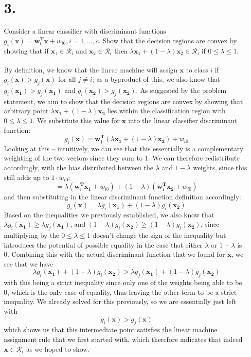 \documentclass{article}
\begin{document}
{\Large 

\section*{3.}
Consider a linear classifier with discriminant functions \(g_i(\mathbf{x}) = \mathbf{w}_\mathbf{i}^{\mathbf{T}} \mathbf{x} + w_{i0}, i = 1, \dots, c\). Show that the decision regions are convex by showing that if \(\mathbf{x}_1 \in \mathcal{R}_i\) and \(\mathbf{x}_2 \in \mathcal{R}_i\) then \(\lambda \mathbf{x}_1 + (1 - \lambda) \mathbf{x}_2 \in \mathcal{R}_i\) if \(0 \leq \lambda \leq 1\). \\ \\
By definition, we know that the linear machine will assign \(\mathbf{x}\) to class \(i\) if \(g_i(\mathbf{x}) > g_j(\mathbf{x})\) for all \(j \neq i\); as a byproduct of this, we also know that \(g_i(\mathbf{x_1}) > g_j(\mathbf{x_1})\) and \(g_i(\mathbf{x_2}) > g_j(\mathbf{x_2})\). As suggested by the problem statement, we aim to show that the decision regions are convex by showing that arbitrary point \(\lambda \mathbf{x_1} + (1 - \lambda) \mathbf{x_2}\) lies within the classification region with \(0 \leq \lambda \leq 1\). We substitute this value for \(\mathbf{x}\) into the linear classifier discriminant function:
\[
  g_i(\mathbf{x}) = \mathbf{w_i^T}(\lambda \mathbf{x_1} + (1 - \lambda) \mathbf{x_2}) + w_{i0} 
\]
Looking at this -- intuitively, we can see that this essentially is a complementary weighting of the two vectors since they sum to 1. We can therefore redistribute accordingly, with the bias distributed between the \(\lambda\) and \(1 - \lambda\) weights, since this still adds up to \(1 \cdot w_{i0}\):
\[
  = \lambda(\mathbf{w_i^T x_1} + w_{i0}) + (1 - \lambda)(\mathbf{w_i^T x_2} + w_{i0})
\]
and then substituting in the linear discriminant function definition accordingly:
\[
  g_i(\mathbf{x}) = \lambda g_i(\mathbf{x_1}) + (1 - \lambda) g_i(\mathbf{x_2})
\]
Based on the inequalities we previously established, we also know that \(\lambda g_i(\mathbf{x_1}) \geq \lambda g_j(\mathbf{x_1}) \), and \((1 - \lambda) g_i(\mathbf{x_2}) \geq (1 - \lambda) g_i(\mathbf{x_2})\), since multiplying by the \(0 \leq \lambda \leq 1\) doesn't change the sign of the inequality but introduces the potential of possible equality in the case that either \(\lambda\) or \(1 - \lambda\) is 0. Combining this with the actual discriminant function that we found for \(\mathbf{x}\), we see that we have 
\[
  \lambda g_i(\mathbf{x_1}) + (1 - \lambda) g_i(\mathbf{x_2}) > \lambda g_j(\mathbf{x_1}) + (1 - \lambda) g_j(\mathbf{x_2})
\]
with this being a strict inequality since only one of the weights being able to be 0, which is the only case of equality, thus leaving the other term to be a strict inequality. We already solved for this previously, so we are essentially just left with 
\[
  g_i(\mathbf{x}) > g_j(\mathbf{x})
\]
which shows us that this intermediate point satisfies the linear machine assignment rule that we first started with, which therefore indicates that indeed \(\mathbf{x} \in \mathcal{R}_i\) as we hoped to show.

}
\end{document}
